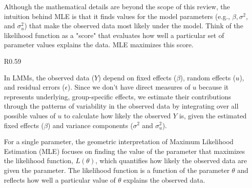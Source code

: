 Although the mathematical details are beyond the scope of this review, the intuition behind MLE is that it finds values for the model parameters (e.g., $\beta, \sigma^2$, and $\sigma_u^2$) that make the observed data most likely under the model. Think of the likelihood function as a "score" that evaluates how well a particular set of parameter values explains the data. MLE maximizes this score.

\begin{wrapfigure}{R}{0.59\textwidth}
\begin{tcolorbox}[every float=\centering, drop shadow, title=One-parameter MLE ,colback=white,colframe=WMgreen,
  colbacktitle=WMgreen,]
  \label{fig:MLEplot}
 \end{tcolorbox}
 \end{wrapfigure}
 
 In LMMs, the observed data ($Y$) depend on fixed effects ($\beta$), random effects ($u$), and residual errors ($\epsilon$). Since we don't have direct measures of $u$ because it represents underlying, group-specific effects, we estimate their contributions through the patterns of variability in the observed data by integrating over all possible values of $u$ to calculate how likely the observed $Y$ is, given the estimated fixed effects ($\beta$) and variance components ($\sigma^2$ and $\sigma_u^2$).
 
For a single parameter, the geometric interpretation of Maximum Likelihood Estimation (MLE) focuses on finding the value of the parameter that maximizes the likelihood function, $L(\theta)$, which quantifies how likely the observed data are given the parameter. The likelihood function is a function of the parameter $\theta$ and reflects how well a particular value of 
$\theta$ explains the observed data.

